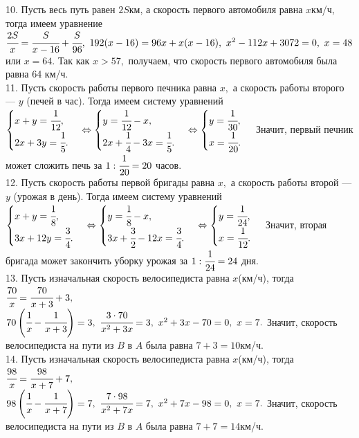 \documentclass[12pt]{article}
\begin{document}
10. Пусть весь путь равен $2S$км, а скорость первого автомобиля равна $x$км/ч, тогда имеем уравнение $\cfrac{2S}{x}=\cfrac{S}{x-16}+\cfrac{S}{96},\
192(x-16)=96x+x(x-16),\ x^2-112x+3072=0,\ x=48$ или $x=64.$ Так как $x>57,$ получаем, что скорость первого автомобиля была равна 64 км/ч.\\
11. Пусть скорость работы первого печника равна $x,$ а скорость работы второго --- $y$ (печей в час). Тогда имеем систему уравнений
$\begin{cases} x+y=\cfrac{1}{12},\\ 2x+3y=\cfrac{1}{5}.\end{cases}
\Leftrightarrow \begin{cases} y=\cfrac{1}{12}-x,\\ 2x+\cfrac{1}{4}-3x=\cfrac{1}{5}.\end{cases}
\Leftrightarrow \begin{cases} y=\cfrac{1}{30},\\ x=\cfrac{1}{20}.\end{cases}$
Значит, первый печник может сложить печь за $1:\cfrac{1}{20}=20$ часов.\\
12. Пусть скорость работы первой бригады равна $x,$ а скорость работы второй --- $y$ (урожая в день). Тогда имеем систему уравнений
$\begin{cases} x+y=\cfrac{1}{8},\\ 3x+12y=\cfrac{3}{4}.\end{cases}
\Leftrightarrow \begin{cases} y=\cfrac{1}{8}-x,\\ 3x+\cfrac{3}{2}-12x=\cfrac{3}{4}.\end{cases}
\Leftrightarrow \begin{cases} y=\cfrac{1}{24},\\ x=\cfrac{1}{12}.\end{cases}$
Значит, вторая бригада может закончить уборку урожая за $1:\cfrac{1}{24}=24$ дня.\\
13. Пусть изначальная скорость велосипедиста равна $x$(км/ч), тогда $\cfrac{70}{x}=\cfrac{70}{x+3}+3,$\\$
70\left(\cfrac{1}{x}-\cfrac{1}{x+3}\right)=3,\ \cfrac{3\cdot70}{x^2+3x}=3,\ x^2+3x-70=0,\ x=7.$ Значит, скорость велосипедиста на пути из $B$ в $A$ была равна $7+3=10$км/ч.\\
14. Пусть изначальная скорость велосипедиста равна $x$(км/ч), тогда $\cfrac{98}{x}=\cfrac{98}{x+7}+7,$\\$
98\left(\cfrac{1}{x}-\cfrac{1}{x+7}\right)=7,\ \cfrac{7\cdot98}{x^2+7x}=7,\ x^2+7x-98=0,\ x=7.$ Значит, скорость велосипедиста на пути из $B$ в $A$ была равна $7+7=14$км/ч.\\
\end{document}

